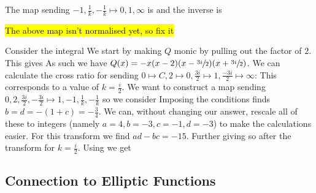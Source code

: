 \documentclass{article}
\begin{document}
\begin{lemma}
	The map sending $-1,\frac{1}{k},-\frac{1}{k} \mapsto 0,1,\infty$ is 
and the inverse is 
\end{lemma}
\begin{remark}
	\hl{The above map isn't normalised yet, so fix it}
\end{remark}

\begin{example}
	Consider the integral 
We start by making $Q$ monic by pulling out the factor of $2$. This gives 
As such we have $Q(x) = -x(x-2)(x-\sfrac{3i}{2})(x+\sfrac{3i}{2})$. We can  calculate the cross ratio for sending $0 \mapsto C, 2 \mapsto 0, \frac{3i}{2} \mapsto 1, \frac{-3i}{2}\mapsto \infty$:
This corresponds to a value of $k=\frac{i}{2}$. We want to construct a map sending $0,2,\frac{3i}{2},-\frac{3i}{2} \mapsto 1,-1,\frac{1}{k}, -\frac{1}{k}$ so we consider 
Imposing the conditions finds $b=d=-(1+c) = -\frac{3}{4}$. We can, without changing our answer, rescale all of these to integers (namely $a=4, b=-3, c=-1, d=-3$) to make the calculations easier. For this transform we find $ad-bc=-15$. Further
giving 
so after the transform 
for $k=\frac{i}{2}$. Using 
we get 
\end{example}

\subsection{Connection to Elliptic Functions}
\end{document}
